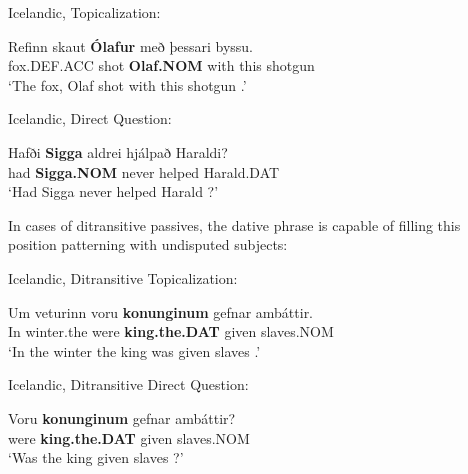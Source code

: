 \begin{exe}
	\ex Icelandic, Topicalization:\label{ex:ice-topic}
\begin{xlist}
	\ex \gll Refinn skaut \textbf{Ólafur} með  þessari byssu.\\
	fox.DEF.ACC shot \textbf{Olaf.NOM} with this shotgun\\
\trans `The fox, Olaf shot with this shotgun \citep[ex. 19a]{Zaenen.1985}.'
\end{xlist}
\ex Icelandic, Direct Question:\label{ex:ice-dq}
\begin{xlist}
	\ex \gll Hafði \textbf{Sigga} aldrei hjálpað Haraldi?\\
	had \textbf{Sigga.NOM} never helped Harald.DAT\\
\trans `Had Sigga never helped Harald \citep[ex. 20b]{Zaenen.1985}?'
\end{xlist}
\end{exe}

In cases of ditransitive passives, the dative phrase is capable of filling this position patterning with undisputed subjects:

\begin{exe}
	\ex Icelandic, Ditransitive Topicalization:\label{ex:ice-dittop}
\begin{xlist}
	\ex \gll Um veturinn voru \textbf{konunginum} gefnar amb\'{a}ttir.\\
In winter.the were \textbf{king.the.DAT} given slaves.NOM\\
\trans `In the winter the king was given slaves \citep[ex. 47a]{Zaenen.1985}.'
\end{xlist}
\ex Icelandic, Ditransitive Direct Question:\label{ex:ice-ditdq}
\begin{xlist}
	\ex \gll Voru \textbf{konunginum} gefnar amb\'{a}ttir?\\
were \textbf{king.the.DAT} given slaves.NOM\\
\trans `Was the king given slaves \citep[ex. 48a]{Zaenen.1985}?'
\end{xlist}
\end{exe}

